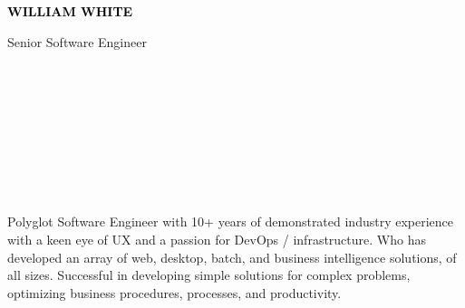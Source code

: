 \documentclass[9pt]{basecv} %
\begin{document}
\begin{minipage}[t]{0.4\textwidth}
    \vspace{-\baselineskip} %
    { \fontsize{16}{20} \textcolor{black}{\textbf{\MakeUppercase{William White}}}} %

    \vspace{6pt}

    {\Large Senior Software Engineer} %
\end{minipage}
\hfill
\begin{minipage}[t]{0.19\textwidth} %
    \vspace{-\baselineskip} %
    \\
    \\
    \\
\end{minipage}
\begin{minipage}[t]{0.28\textwidth} %
    \vspace{-\baselineskip} %
    \\
    \\
    \\
\end{minipage}
\begin{minipage}[t]{0.4\textwidth}
    \\
    Polyglot Software Engineer with 10+ years of demonstrated industry experience with a keen eye of UX and a passion for DevOps / infrastructure. Who has developed an array of web, desktop, batch, and business intelligence solutions, of all sizes. Successful in developing simple solutions for complex problems, optimizing business procedures, processes, and productivity.
\end{minipage}
\end{document}
